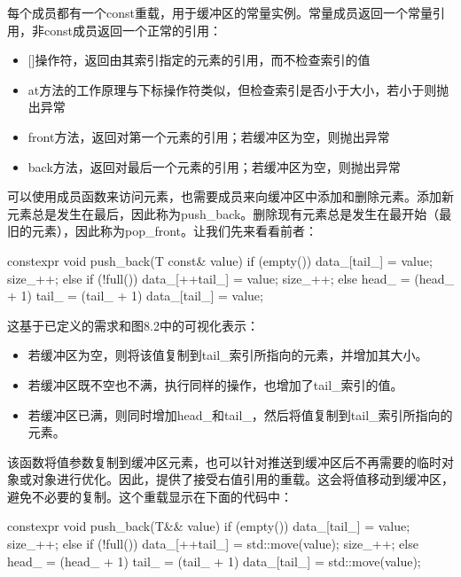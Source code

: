 每个成员都有一个const重载，用于缓冲区的常量实例。常量成员返回一个常量引用，非const成员返回一个正常的引用：

\begin{itemize}
\item
{}[]操作符，返回由其索引指定的元素的引用，而不检查索引的值

\item
at方法的工作原理与下标操作符类似，但检查索引是否小于大小，若小于则抛出异常

\item
front方法，返回对第一个元素的引用；若缓冲区为空，则抛出异常

\item
back方法，返回对最后一个元素的引用；若缓冲区为空，则抛出异常
\end{itemize}

可以使用成员函数来访问元素，也需要成员来向缓冲区中添加和删除元素。添加新元素总是发生在最后，因此称为push\_back。删除现有元素总是发生在最开始（最旧的元素），因此称为pop\_front。让我们先来看看前者：

\begin{cpp}
constexpr void push_back(T const& value)
{
	if (empty())
	{
		data_[tail_] = value;
		size_++;
	}
	else if (!full())
	{
		data_[++tail_] = value;
		size_++;
	}
	else
	{
		head_ = (head_ + 1) %
		tail_ = (tail_ + 1) %
		data_[tail_] = value;
	}
}
\end{cpp}

这基于已定义的需求和图8.2中的可视化表示：

\begin{itemize}
\item
若缓冲区为空，则将该值复制到tail\_索引所指向的元素，并增加其大小。

\item
若缓冲区既不空也不满，执行同样的操作，也增加了tail\_索引的值。

\item
若缓冲区已满，则同时增加head\_和tail\_，然后将值复制到tail\_索引所指向的元素。
\end{itemize}

该函数将值参数复制到缓冲区元素，也可以针对推送到缓冲区后不再需要的临时对象或对象进行优化。因此，提供了接受右值引用的重载。这会将值移动到缓冲区，避免不必要的复制。这个重载显示在下面的代码中：

\begin{cpp}
constexpr void push_back(T&& value)
{
	if (empty())
	{
		data_[tail_] = value;
		size_++;
	}
	else if (!full())
	{
		data_[++tail_] = std::move(value);
		size_++;
	}
	else
	{
	head_ = (head_ + 1) %
	tail_ = (tail_ + 1) %
	data_[tail_] = std::move(value);
	}
}
\end{cpp}

